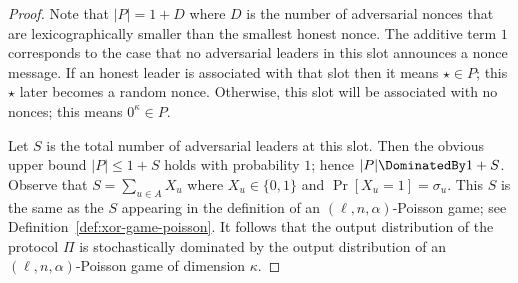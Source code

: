 \begin{proof}
		Note that 
		$|P| = 1 + D$ where $D$ is the number of adversarial nonces that are 
		lexicographically smaller than the smallest honest nonce. 
		The additive term $1$ corresponds to the case that 
		no adversarial leaders in this slot announces a nonce message. 
		If an honest leader is associated with that slot 
		then it means $\star \in P$; this $\star$ later becomes a random nonce. 
		Otherwise, this slot will be associated with no nonces; 
		this means $0^\kappa \in P$.

		Let $S$ is the total number of adversarial leaders at this slot.
		Then the obvious upper bound $|P| \leq 1 + S$ holds with probability $1$; 
		hence $|P| \DominatedBy 1 + S$. 
		Observe that $S = \sum_{u \in A} X_u$ where $X_u \in \{0,1\}$ and $\Pr[X_u = 1] = \sigma_u$. 
		This $S$ is the same as the $S$ appearing in the definition  
		of an $(\ell, n, \alpha)$-Poisson game; see Definition~\ref{def:xor-game-poisson}.
		It follows that the 
		output distribution of the protocol $\Pi$
		is 
		stochastically dominated by the 
		output distribution of 
		an $(\ell, n, \alpha)$-Poisson game of dimension $\kappa$.
\end{proof}












